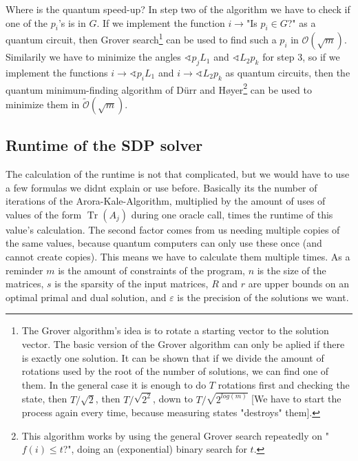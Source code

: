\documentclass[11pt,a4paper]{scrartcl}
\DeclareMathOperator{\Tr}{Tr}
\begin{document}
Where is the quantum speed-up? In step two of the algorithm we have to check if one of the $p_i$'s is in $G$. If we implement the function $i\to$"Is $p_i\in G$?" as a  quantum circuit, then Grover search\footnote{The Grover algorithm's idea is to rotate a starting vector to the solution vector. The basic version of the Grover algorithm can only be aplied if there is exactly one solution. It can be shown that if we divide the amount of rotations used by the root of the number of solutions, we can find one of them. In the general case it is enough to do $T$ rotations first and checking the state, then $T/\sqrt 2$, then $T/\sqrt {2^2}$, down to $T/\sqrt {2^{log(m)}}$ [We have to start the process again every time, because measuring states "destroys" them].} can be used to find such a $p_i$ in $\mathcal{O}(\sqrt{m})$. Similarily we have to minimize the angles $\sphericalangle p_j L_1$ and $\sphericalangle L_2 p_k$ for step 3, so if we implement the functions $i\to\sphericalangle p_i L_1$ and $i\to \sphericalangle L_2 p_k$ as quantum circuits, then the quantum minimum-finding algorithm of Dürr and Høyer\footnote{This algorithm works by using the general Grover search repeatedly on "$f(i)\leq t$?", doing an (exponential) binary search for $t$.} can be used to minimize them in $\tilde{\mathcal{O}}(\sqrt{m})$.


\subsection{Runtime of the SDP solver}

The calculation of the runtime is not that complicated, but we would have to use a few formulas we didnt explain or use before. Basically its the number of iterations of the Arora-Kale-Algorithm, multiplied by the amount of uses of values of the form $\Tr(A_j)$ during one oracle call, times the runtime of this value's calculation. The second factor comes from us needing multiple copies of the same values, because quantum computers can only use these once (and cannot create copies). This means we have to calculate them multiple times. As a reminder $m$ is the amount of constraints of the program, $n$ is the size of the matrices, $s$ is the sparsity of the input matrices, $R$ and $r$ are upper bounds on an optimal primal and dual solution, and $\varepsilon$ is the precision of the solutions we want.
\end{document}
